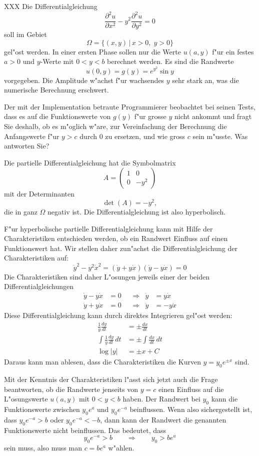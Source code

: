 XXX
Die Differentialgleichung
\[
\frac{\partial^2 u}{\partial x^2}-y^2\frac{\partial^2u}{\partial y^2}=0
\]
soll im Gebiet
\[
\Omega=\{(x,y)\,|\,x>0,\;y>0\}
\]
gel"ost werden.
In einer ersten Phase sollen nur die Werte $u(a,y)$ f"ur ein festes 
$a > 0$ und $y$-Werte mit $0<y<b$ berechnet werden.
Es sind die Randwerte
\[
u(0,y)=g(y)=e^{y^2}\sin y
\]
vorgegeben. Die Amplitude w"achst f"ur wachsendes $y$ sehr stark an,
was die numerische Berechnung erschwert.

Der mit der Implementation betraute Programmierer beobachtet bei seinen
Tests, dass es auf die Funktionswerte von $g(y)$ f"ur grosse
$y$ nicht ankommt und fragt Sie deshalb, ob es m"oglich w"are, zur
Vereinfachung der Berechnung die Anfangswerte f"ur $y>c$ durch
$0$ zu ersetzen, und wie gross $c$ sein m"usste. Was antworten Sie?

\begin{loesung}
Die partielle Differentialgleichung hat die Symbolmatrix
\[
A=
\begin{pmatrix}
1&0\\0&-y^2
\end{pmatrix}
\]
mit der Determinanten
\[
\det(A)=-y^2,
\]
die in ganz $\Omega$ negativ ist.
Die Differentialgleichung ist also hyperbolisch.

F"ur hyperbolische partielle Differentialgleichung kann mit Hilfe der
Charakteristiken entschieden werden, ob ein Randwert Einfluss auf einen
Funktionswert hat. Wir stellen daher zun"achst die Differentialgleichung
der Charakteristiken auf:
\[
\dot y^2-y^2\dot x^2=(\dot y+y\dot x)(\dot y-y\dot x)=0
\]
Die Charakteristiken sind daher L"osungen jeweils einer der beiden
Differentialgleichungen
\begin{align*}
\dot y-y\dot x&=0&&\Rightarrow&\dot y&=y\dot x\\
\dot y+y\dot x&=0&&\Rightarrow&\dot y&=-y\dot x
\end{align*}
Diese Differentialgleichung kann durch direktes Integrieren
gel"ost werden:
\begin{align*}
\frac1y\frac{dy}{dt}&=\pm\frac{dx}{dt}\\
\int \frac1y\frac{dy}{dt}\,dt&=\pm\int \frac{dx}{dt}\,dt\\
\log |y|&= \pm x + C
\end{align*}
Daraus kann man ablesen, dass die Charakteristiken die Kurven 
$y=y_0e^{\pm x}$ sind.

Mit der Kenntnis der Charakteristiken l"asst sich jetzt auch die 
Frage beantworten, ob die Randwerte jenseits von $y=c$ einen Einfluss
auf die L"osungswerte $u(a,y)$ mit $0<y<b$ haben. Der Randwert
bei $y_0$ kann die Funktionswerte zwischen $y_0e^a$ und $y_0e^{-a}$
beinflussen. Wenn also sichergestellt ist, dass $y_0e^{-a} > b$
oder $y_0e^{-a} < -b$, dann kann der Randwert die genannten Funktionswerte
nicht beinflussen. Das bedeutet, dass 
\[
y_0e^{-a}>b
\qquad\Rightarrow\qquad
y_0>be^a
\]
sein muss, also muss man $c=be^a$ w"ahlen.
\end{loesung}

